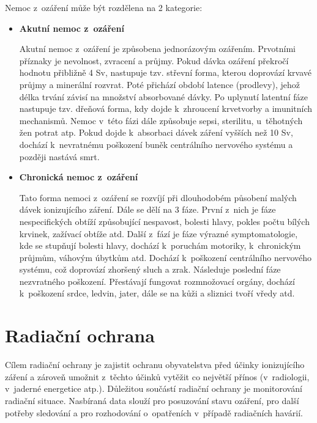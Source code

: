 Nemoc z~ozáření může být rozdělena na 2 kategorie: \cite{nemoc}

\begin{itemize}
	\item \textbf{Akutní nemoc z~ozáření}
	
		Akutní nemoc z~ozáření je způsobena jednorázovým ozářením. Prvotními příznaky je nevolnost, zvracení a průjmy. Pokud dávka ozáření překročí hodnotu přibližně 4 Sv, nastupuje tzv. střevní forma, kterou doprovází krvavé průjmy a minerální rozvrat. Poté přichází období latence (prodlevy), jehož délka trvání závisí na množství absorbované dávky. Po uplynutí latentní fáze nastupuje tzv. dřeňová forma, kdy dojde k~zhroucení krvetvorby a imunitních mechanismů. Nemoc v~této fázi dále způsobuje sepsi, sterilitu, u~těhotných žen potrat atp. Pokud dojde k~absorbaci dávek záření vyšších než 10 Sv, dochází k~nevratnému poškození buněk centrálního nervového systému a později nastává smrt.
		
	\item \textbf{Chronická nemoc z~ozáření}
	
		Tato forma nemoci z~ozáření se rozvíjí při dlouhodobém působení malých dávek ionizujícího záření. Dále se dělí na 3 fáze. První z~nich je fáze nespecifických obtíží způsobující nespavost, bolesti hlavy, pokles počtu bílých krvinek, zažívací obtíže atd. Další z~fází je fáze výrazné symptomatologie, kde se stupňují bolesti hlavy, dochází k~poruchám motoriky, k~chronickým průjmům, váhovým úbytkům atd. Dochází k~poškození centrálního nervového systému, což doprovází zhoršený sluch a zrak. Následuje poslední fáze nezvratného poškození. Přestávají fungovat rozmnožovací orgány, dochází k~poškození srdce, ledvin, jater, dále se na kůži a sliznici tvoří vředy atd. 

\end{itemize}

\section{Radiační ochrana} 
Cílem radiační ochrany je zajistit ochranu obyvatelstva před účinky ionizujícího záření a zároveň umožnit z~těchto účinků vytěžit co největší přínos (v~radiologii, v~jaderné energetice atp.). Důležitou součástí radiační ochrany je monitorování radiační situace. Nasbíraná data slouží pro posuzování stavu ozáření, pro další potřeby sledování a pro rozhodování o~opatřeních v~případě radiačních havárií. \cite{suroRadOch} \cite{sujbRadSit}

